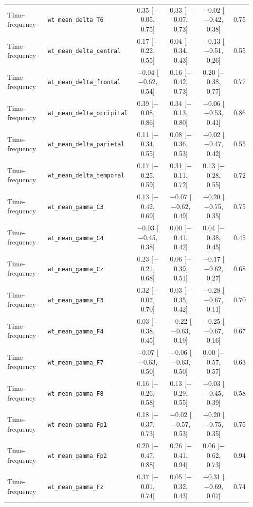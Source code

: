 {\begin{longtable}{llcccc}
Time-frequency & \texttt{wt\_mean\_delta\_T6} & 0.35 [$-$0.05, 0.75] & 0.33 [$-$0.07, 0.73] & $-$0.02 [$-$0.42, 0.38] & 0.75 \\
Time-frequency & \texttt{wt\_mean\_delta\_central} & 0.17 [$-$0.22, 0.55] & 0.04 [$-$0.34, 0.43] & $-$0.13 [$-$0.51, 0.26] & 0.55 \\
Time-frequency & \texttt{wt\_mean\_delta\_frontal} & $-$0.04 [$-$0.62, 0.54] & 0.16 [$-$0.42, 0.73] & 0.20 [$-$0.38, 0.77] & 0.77 \\
Time-frequency & \texttt{wt\_mean\_delta\_occipital} & 0.39 [$-$0.08, 0.86] & 0.34 [$-$0.13, 0.80] & $-$0.06 [$-$0.53, 0.41] & 0.86 \\
Time-frequency & \texttt{wt\_mean\_delta\_parietal} & 0.11 [$-$0.34, 0.55] & 0.08 [$-$0.36, 0.53] & $-$0.02 [$-$0.47, 0.42] & 0.55 \\
Time-frequency & \texttt{wt\_mean\_delta\_temporal} & 0.17 [$-$0.25, 0.59] & 0.31 [$-$0.11, 0.72] & 0.13 [$-$0.28, 0.55] & 0.72 \\
Time-frequency & \texttt{wt\_mean\_gamma\_C3} & 0.13 [$-$0.42, 0.69] & $-$0.07 [$-$0.62, 0.49] & $-$0.20 [$-$0.75, 0.35] & 0.75 \\
Time-frequency & \texttt{wt\_mean\_gamma\_C4} & $-$0.03 [$-$0.45, 0.38] & 0.00 [$-$0.41, 0.42] & 0.04 [$-$0.38, 0.45] & 0.45 \\
Time-frequency & \texttt{wt\_mean\_gamma\_Cz} & 0.23 [$-$0.21, 0.68] & 0.06 [$-$0.39, 0.51] & $-$0.17 [$-$0.62, 0.27] & 0.68 \\
Time-frequency & \texttt{wt\_mean\_gamma\_F3} & 0.32 [$-$0.07, 0.70] & 0.03 [$-$0.35, 0.42] & $-$0.28 [$-$0.67, 0.11] & 0.70 \\
Time-frequency & \texttt{wt\_mean\_gamma\_F4} & 0.03 [$-$0.38, 0.45] & $-$0.22 [$-$0.63, 0.19] & $-$0.25 [$-$0.67, 0.16] & 0.67 \\
Time-frequency & \texttt{wt\_mean\_gamma\_F7} & $-$0.07 [$-$0.63, 0.50] & $-$0.06 [$-$0.63, 0.50] & 0.00 [$-$0.57, 0.57] & 0.63 \\
Time-frequency & \texttt{wt\_mean\_gamma\_F8} & 0.16 [$-$0.26, 0.58] & 0.13 [$-$0.29, 0.55] & $-$0.03 [$-$0.45, 0.39] & 0.58 \\
Time-frequency & \texttt{wt\_mean\_gamma\_Fp1} & 0.18 [$-$0.37, 0.73] & $-$0.02 [$-$0.57, 0.53] & $-$0.20 [$-$0.75, 0.35] & 0.75 \\
Time-frequency & \texttt{wt\_mean\_gamma\_Fp2} & 0.20 [$-$0.47, 0.88] & 0.26 [$-$0.41, 0.94] & 0.06 [$-$0.62, 0.73] & 0.94 \\
Time-frequency & \texttt{wt\_mean\_gamma\_Fz} & 0.37 [$-$0.01, 0.74] & 0.05 [$-$0.32, 0.43] & $-$0.31 [$-$0.69, 0.07] & 0.74 \\

\end{longtable}}
